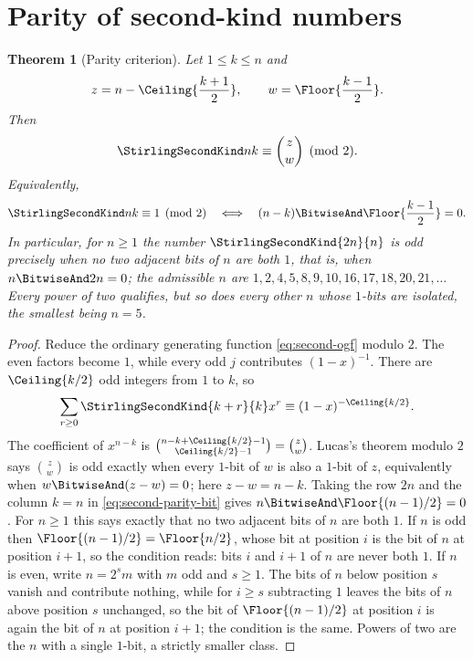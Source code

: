 \documentclass[11pt,a4paper,oneside,openany]{book}
\newtheorem{theorem}{Theorem}[chapter]
\theoremstyle{definition}
\theoremstyle{remark}
\begin{document}
\section{Parity of second-kind numbers}
\begin{theorem}[Parity criterion]\label{thm:second-parity}
Let $1\le k\le n$ and
\[
 z=n-\Ceiling{\frac{k+1}{2}},
 \qquad w=\Floor{\frac{k-1}{2}}.
\]
Then
\begin{equation}\label{eq:second-parity-binomial}
 \StirlingSecondKind nk\equiv\binom zw\pmod2.
\end{equation}
Equivalently,
\begin{equation}\label{eq:second-parity-bit}
 \StirlingSecondKind nk\equiv1\pmod2
 \quad\Longleftrightarrow\quad
 (n-k)\BitwiseAnd\Floor{\frac{k-1}{2}}=0.
\end{equation}
In particular, for $n\ge1$ the number $\StirlingSecondKind{2n}{n}$ is odd precisely when
no two adjacent bits of $n$ are both $1$, that is, when $n\BitwiseAnd 2n=0$; the
admissible $n$ are $1,2,4,5,8,9,10,16,17,18,20,21,\dots$  Every power of two qualifies,
but so does every other $n$ whose $1$-bits are isolated, the smallest being $n=5$.
\end{theorem}
\begin{proof}
Reduce the ordinary generating function \cref{eq:second-ogf} modulo $2$.  The even
factors become $1$, while every odd $j$ contributes $(1-x)^{-1}$.  There are
$\Ceiling{k/2}$ odd integers from $1$ to $k$, so
\[
 \sum_{r\ge0}\StirlingSecondKind{k+r}{k}x^r
 \equiv(1-x)^{-\Ceiling{k/2}}.
\]
The coefficient of $x^{n-k}$ is
$\binom{n-k+\Ceiling{k/2}-1}{\Ceiling{k/2}-1}=\binom zw$.
Lucas's theorem modulo $2$ says $\binom zw$ is odd exactly when every $1$-bit of $w$
is also a $1$-bit of $z$, equivalently when $w\BitwiseAnd(z-w)=0$; here $z-w=n-k$.
Taking the row $2n$ and the column $k=n$ in \cref{eq:second-parity-bit} gives
$n\BitwiseAnd\Floor{(n-1)/2}=0$.  For $n\ge1$ this says exactly that no two adjacent
bits of $n$ are both $1$.  If $n$ is odd then $\Floor{(n-1)/2}=\Floor{n/2}$, whose bit
at position $i$ is the bit of $n$ at position $i+1$, so the condition reads: bits $i$ and
$i+1$ of $n$ are never both $1$.  If $n$ is even, write $n=2^{s}m$ with $m$ odd and
$s\ge1$.  The bits of $n$ below position $s$ vanish and contribute nothing, while for
$i\ge s$ subtracting $1$ leaves the bits of $n$ above position $s$ unchanged, so the bit
of $\Floor{(n-1)/2}$ at position $i$ is again the bit of $n$ at position $i+1$; the
condition is the same.  Powers of two are the $n$ with a single $1$-bit, a strictly
smaller class.
\end{proof}
\end{document}
